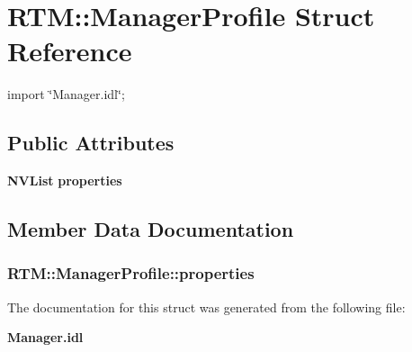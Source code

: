 \section{RTM::ManagerProfile Struct Reference}
\label{structRTM_1_1ManagerProfile}


{\ttfamily import \char`\"{}Manager.idl\char`\"{};}

\subsection*{Public Attributes}
\begin{DoxyCompactItemize}
\item 
{\bf NVList} {\bf properties}
\end{DoxyCompactItemize}


\subsection{Member Data Documentation}
\subsubsection[{properties}]{ {\bf RTM::ManagerProfile::properties}}\label{structRTM_1_1ManagerProfile_af67044fc7a718c3b3d5f51527277a749}


The documentation for this struct was generated from the following file:\begin{DoxyCompactItemize}
\item 
{\bf Manager.idl}\end{DoxyCompactItemize}
